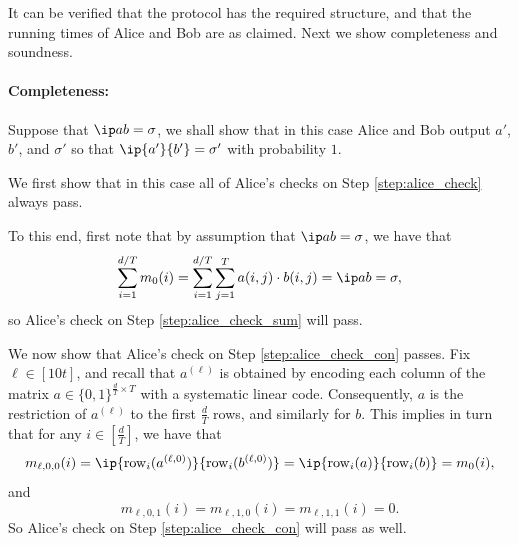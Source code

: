 \documentclass[11pt]{article}
\theoremstyle{plain}
\theoremstyle{remark}
\newcommand{\row}{\mathrm{row}}
\begin{document}
It can be verified that the protocol has the required structure, and that the running times of Alice and Bob are as claimed. Next we show completeness and soundness.


\paragraph{Completeness:}

Suppose that $\ip a b = \sigma$, we shall show that in this case Alice and Bob output $a'$, $b'$, and $\sigma'$ so that $\ip {a'} {b'} = \sigma'$ with probability $1$. 

We first show that in this case all of Alice's checks on Step \ref{step:alice_check} always pass.

To this end, first note that  by assumption that $\ip a b = \sigma$, we have that
\begin{equation}\label{eq:complete_1}
\sum_{i=1}^{d/T} m_0(i) = \sum_{i=1}^{d/T} \sum_{j=1}^T  a(i,j) \cdot b(i,j) = \ip a b = \sigma,
\end{equation} 
so Alice's check on Step \ref{step:alice_check_sum} will pass.

We now show that Alice's check on Step \ref{step:alice_check_con} passes. Fix $\ell \in [10 t]$, and recall that $a^{(\ell)}$ is obtained by encoding each column of the matrix $a \in \{0,1\}^{\frac d T \times T}$ with 
a systematic linear code.
Consequently, $a$ is the restriction of
$a^{(\ell)}$  to the first $\frac d T$ rows, and similarly for $b$.
This implies in turn that  for any $i \in [\frac d T]$, we have that
\begin{equation}\label{eq:complete_2}
m_{\ell,0,0}(i) = \ip{\row_i(a^{(\ell,0)})}  {\row_i(b^{(\ell,0)})} = \ip{\row_i(a)}  {\row_i(b)} = m_0(i),
\end{equation}
and 
\begin{equation}\label{eq:complete_3}
m_{\ell,0,1} (i) = m_{\ell,1,0} (i) = m_{\ell,1,1} (i) =0. 
\end{equation}
So Alice's check on Step \ref{step:alice_check_con} will pass as well.
\end{document}
